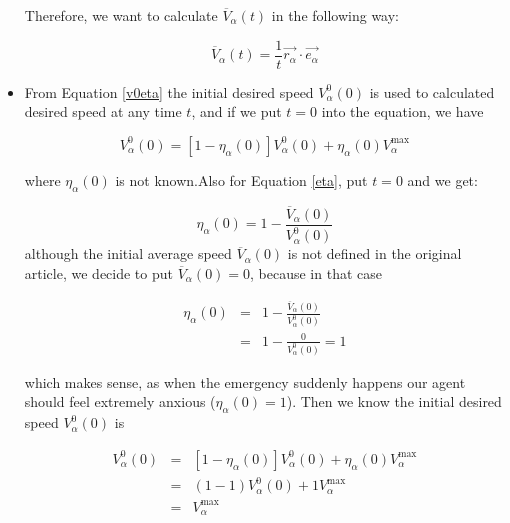 \begin{itemize}
Therefore, we want to calculate $\overline{V}_{\alpha} \left( t \right)$ in the following way:

\begin{equation}\label{averagespeed}
   \overline{V}_{\alpha} \left( t \right) = \frac{1}{t} \vec{r_{\alpha}}\cdot \vec{e_{\alpha}} 
\end{equation}

\item From Equation \ref{v0eta} the initial desired speed $V_{\alpha}^{0} \left( 0 \right)$ is used 
to calculated desired speed at any time $ t $, and if we put $ t=0 $ into the equation, we have

\begin{equation}
    V_{\alpha}^{0}\left( 0 \right) = \left[ 1 - \eta_{\alpha} \left( 0 \right) \right] 
    V_{\alpha}^{0} \left( 0 \right) +
    \eta_{\alpha} \left( 0 \right)V_{\alpha}^{\text{max}}
\end{equation}

where $ \eta_{\alpha} \left( 0 \right) $ is not known.Also for Equation \ref{eta}, put $ t=0 $ and we get:

\begin{equation}
	\eta_{\alpha} \left( 0 \right) =
    1 - \frac{\overline{V}_{\alpha} \left( 0 \right)}
             {V_{\alpha}^{0} \left( 0 \right)}
\end{equation}
although the initial average speed $ \overline{V}_{\alpha} \left( 0 \right) $ is not defined in the original article, 
we decide to put $ \overline{V}_{\alpha} \left( 0 \right)=0 $, because in that case 

\begin{eqnarray}
	\eta_{\alpha} \left( 0 \right) &=&
    1 - \frac{\overline{V}_{\alpha} \left( 0 \right)}
             {V_{\alpha}^{0} \left( 0 \right)}\\
&=& 1 - \frac{0}{V_{\alpha}^{0} \left( 0 \right)}
= 1
\end{eqnarray}

which makes sense, as when the emergency suddenly happens our agent should feel extremely anxious 
($ \eta_{\alpha} \left( 0 \right)=1 $). Then we know the initial desired speed $ V_{\alpha}^{0}\left( 0 \right) $ is

\begin{eqnarray}
    V_{\alpha}^{0}\left( 0 \right) &=& \left[ 1 - \eta_{\alpha} \left( 0 \right) \right] 
    V_{\alpha}^{0} \left( 0 \right) +
    \eta_{\alpha} \left( 0 \right)V_{\alpha}^{\text{max}}\\
&=& \left( 1 - 1 \right)  
    V_{\alpha}^{0} \left( 0 \right) +
    1 V_{\alpha}^{\text{max}}\\
&=& V_{\alpha}^{\text{max}}
\end{eqnarray}


\end{itemize}
